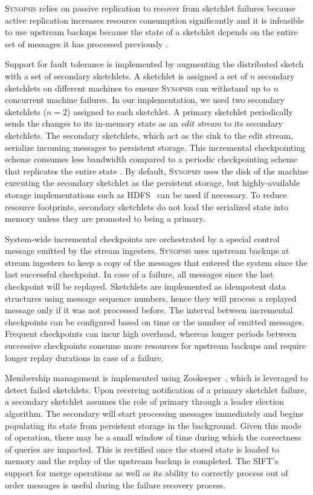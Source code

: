 \textsc{Synopsis} relies on passive replication to recover from sketchlet failures because active replication increases resource consumption significantly and it is infeasible to use upstream backups because the state of a sketchlet depends on the entire set of messages it has processed previously \cite{castro2013integrating}.

Support for fault tolerance is implemented by augmenting the distributed sketch with a set of secondary sketchlets.
A sketchlet is assigned a set of $n$ secondary sketchlets on different machines to ensure \textsc{Synopsis} can withstand up to $n$ concurrent machine failures.
In our implementation, we used two secondary sketchlets ($n=2$) assigned to each sketchlet.
A primary sketchlet periodically sends the changes to its in-memory state as an \emph{edit stream} to its secondary sketchlets.
The secondary sketchlets, which act as the sink to the edit stream, serialize incoming messages to persistent storage.
This incremental checkpointing scheme consumes less bandwidth compared to a periodic checkpointing scheme that replicates the entire state \cite{castro2013integrating}.
By default, \textsc{Synopsis} uses the disk of the machine executing the secondary sketchlet as the persistent storage, but highly-available storage implementations such as HDFS~\cite{borthakur2008hdfs} can be used if necessary.
To reduce resource footprints, secondary sketchlets do not load the serialized state into memory unless they are promoted to being a primary.

System-wide incremental checkpoints are orchestrated by a special control message emitted by the stream ingesters.
\textsc{Synopsis} uses upstream backups at stream ingesters to keep a copy of the messages that entered the system since the last successful checkpoint.
In case of a failure, all messages since the last checkpoint will be replayed.
Sketchlets are implemented as idempotent data structures using message sequence numbers, hence they will process a replayed message only if it was not processed before.
The interval between incremental checkpoints can be configured based on time or the number of emitted messages.
Frequent checkpoints can incur high overhead, whereas longer periods between successive checkpoints consume more resources for upstream backups and require longer replay durations in case of a failure.

Membership management is implemented using Zookeeper~\cite{hunt2010zookeeper}, which is leveraged to detect failed sketchlets.
Upon receiving notification of a primary sketchlet failure, a secondary sketchlet assumes the role of primary through a leader election algorithm.
The secondary will start processing messages immediately and begins populating its state from persistent storage in the background.
Given this mode of operation, there may be a small window of time during which the correctness of queries are impacted.
This is rectified once the stored state is loaded to memory and the replay of the upstream backup is completed.
The SIFT's support for merge operations as well as its ability to correctly process out of order messages is useful during the failure recovery process.


